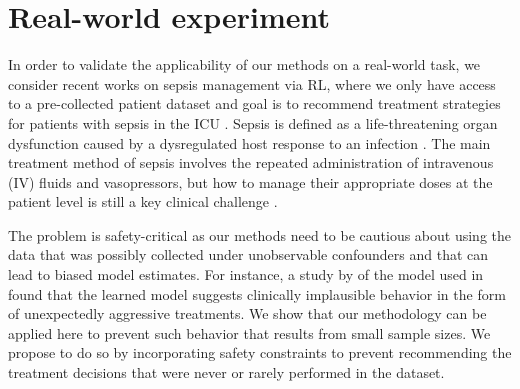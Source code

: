 
\section{Real-world experiment}
\label{sec:sepsis-experiments}


In order to validate the applicability of our methods on a real-world  task, 
we consider recent works on %
sepsis management via RL, where we only have access to a pre-collected patient dataset and goal is to recommend treatment strategies for patients with sepsis in the ICU \citep{komorowski2018artificial,tang2020clinician}.
Sepsis is defined as a life-threatening organ dysfunction caused by a dysregulated host response to an infection \citep{singer2016third}.
The main treatment method of sepsis involves the repeated administration of intravenous (IV) fluids and vasopressors, but how to manage their appropriate doses at the patient level is still a key clinical challenge \citep{rhodes2017surviving}. 


% 

The problem is safety-critical as our methods need to be cautious about using the data that was possibly collected under unobservable confounders and that can lead to biased model estimates. 
For instance, a study by \citet{ji2020trajectory} of the model used in \citet{komorowski2018artificial} found that the learned model suggests clinically implausible behavior in the form of unexpectedly aggressive treatments.
We show that our methodology can be applied here to prevent such behavior that results from small sample sizes. We propose to do so by incorporating safety constraints to prevent recommending the treatment decisions that were never or rarely performed in the dataset. 

